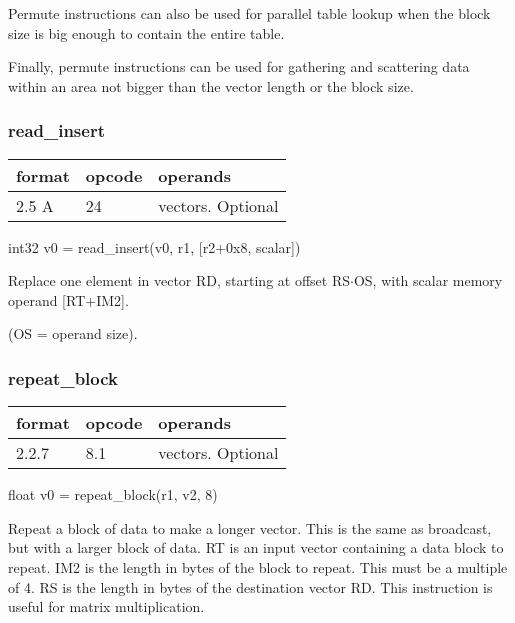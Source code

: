 \documentclass[forwardcom.tex]{subfiles}
\begin{document}
Permute instructions can also be used for parallel table lookup when the block size is big enough to contain the entire table.
\vspace{2mm}

Finally, permute instructions can be used for gathering and scattering data within an area not bigger than the vector length or the block size.

\subsubsection{read\_insert}
\label{table:readInsertInstruction}
\begin{tabular}{|p{12mm}|p{12mm}|p{110mm}|}
\hline
\bfseries format & \bfseries opcode & \bfseries operands \\ \hline
2.5 A & 24 & vectors. Optional \\ \hline
\end{tabular}
\vspace{2mm}

int32 v0 = read\_insert(v0, r1, [r2+0x8, scalar])
\vspace{2mm}

Replace one element in vector RD, starting
at offset RS$\cdot$OS, with scalar memory operand
[RT+IM2].

(OS = operand size).

\subsubsection{repeat\_block}
\label{table:repeatBlockInstruction}
\begin{tabular}{|p{12mm}|p{12mm}|p{110mm}|}
\hline
\bfseries format & \bfseries opcode & \bfseries operands \\ \hline
2.2.7 & 8.1 & vectors. Optional \\ \hline
\end{tabular}
\vspace{2mm}

float v0 = repeat\_block(r1, v2, 8) 
\vspace{2mm}

Repeat a block of data to make a longer vector. This is the same as broadcast, but with a larger block of data. RT is an input vector containing a data block to repeat. IM2 is the length in bytes of the block to repeat. This must be a multiple of 4. RS is the length in bytes of the destination vector RD. This instruction is useful for matrix multiplication.
\vspace{2mm}
\end{document}
